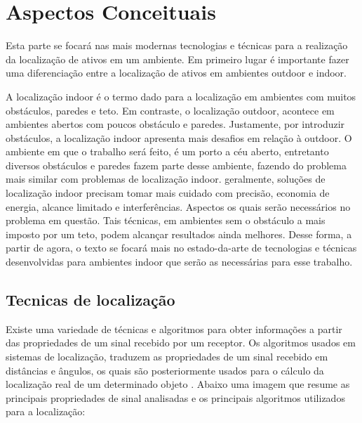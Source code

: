 \chapter{Aspectos Conceituais}
Esta parte se focará nas mais modernas tecnologias e técnicas para a realização da localização de ativos em um ambiente. Em primeiro lugar é importante fazer uma diferenciação entre a localização de ativos em ambientes outdoor e indoor.

A localização indoor é o termo dado para a localização em ambientes com muitos obstáculos, paredes e teto. Em contraste, o localização outdoor, acontece em ambientes abertos com poucos obstáculo e paredes. Justamente, por introduzir obstáculos, a localização indoor apresenta mais desafios em relação à outdoor. O ambiente em que o trabalho será feito, é um porto a céu aberto, entretanto diversos obstáculos e paredes fazem parte desse ambiente, fazendo do problema mais similar com problemas de localização indoor. geralmente, soluções de localização indoor precisam tomar mais cuidado com precisão, economia de energia, alcance limitado e interferências. Aspectos os quais serão necessários no problema em questão. Tais técnicas, em ambientes sem o obstáculo a mais imposto por um teto, podem alcançar resultados ainda melhores. Desse forma, a partir de agora, o texto se focará mais no estado-da-arte de tecnologias e técnicas desenvolvidas para ambientes indoor que serão as necessárias para esse trabalho.

\section{Tecnicas de localização}
Existe uma variedade de técnicas e algoritmos para obter informações a partir das propriedades de um sinal recebido por um receptor. Os algoritmos usados em sistemas de localização, traduzem as propriedades de um sinal recebido em distâncias e ângulos, os quais são posteriormente usados para o cálculo da localização real de um determinado objeto \cite{art5}. Abaixo uma imagem que resume as principais propriedades de sinal analisadas e os principais algoritmos utilizados para a localização:

